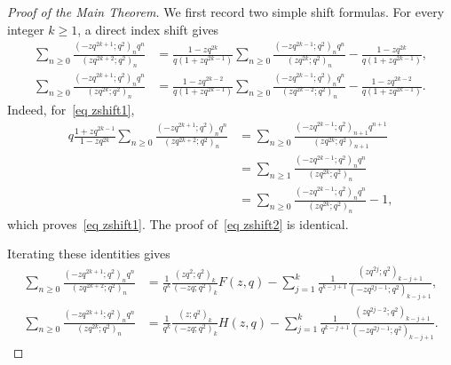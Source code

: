 \documentclass[reqno]{amsart}
\theoremstyle{definition}
\theoremstyle{plain}
\theoremstyle{remark}
\numberwithin{equation}{section}
\begin{document}
\begin{proof}[Proof of the Main Theorem]
We first record two simple shift formulas. For every integer $k\ge 1$, a direct index shift gives
\begin{align}
\sum_{n\ge 0}\frac{(-zq^{2k+1};q^2)_n q^n}{(zq^{2k+2};q^2)_n}
&=\frac{1-zq^{2k}}{q(1+zq^{2k-1})}
\sum_{n\ge 0}\frac{(-zq^{2k-1};q^2)_n q^n}{(zq^{2k};q^2)_n}
-\frac{1-zq^{2k}}{q(1+zq^{2k-1})}, \label{eq zshift1}\\
\sum_{n\ge 0}\frac{(-zq^{2k+1};q^2)_n q^n}{(zq^{2k};q^2)_n}
&=\frac{1-zq^{2k-2}}{q(1+zq^{2k-1})}
\sum_{n\ge 0}\frac{(-zq^{2k-1};q^2)_n q^n}{(zq^{2k-2};q^2)_n}
-\frac{1-zq^{2k-2}}{q(1+zq^{2k-1})}. \label{eq zshift2}
\end{align}
Indeed, for~\eqref{eq zshift1},
\begin{align*}
q\frac{1+zq^{2k-1}}{1-zq^{2k}}
\sum_{n\ge 0}\frac{(-zq^{2k+1};q^2)_n q^n}{(zq^{2k+2};q^2)_n}
&=\sum_{n\ge 0}\frac{(-zq^{2k-1};q^2)_{n+1} q^{n+1}}{(zq^{2k};q^2)_{n+1}}\\
&=\sum_{n\ge 1}\frac{(-zq^{2k-1};q^2)_n q^n}{(zq^{2k};q^2)_n}\\
&=\sum_{n\ge 0}\frac{(-zq^{2k-1};q^2)_n q^n}{(zq^{2k};q^2)_n}-1,
\end{align*}
which proves~\eqref{eq zshift1}. The proof of~\eqref{eq zshift2} is identical.

Iterating these identities gives
\begin{align}
\sum_{n\ge 0}\frac{(-zq^{2k+1};q^2)_n q^n}{(zq^{2k+2};q^2)_n}
&=\frac{1}{q^k}\frac{(zq^2;q^2)_k}{(-zq;q^2)_k}F(z,q)
-\sum_{j=1}^k\frac{1}{q^{k-j+1}}
\frac{(zq^{2j};q^2)_{k-j+1}}{(-zq^{2j-1};q^2)_{k-j+1}}, \label{eq ziterate1}\\
\sum_{n\ge 0}\frac{(-zq^{2k+1};q^2)_n q^n}{(zq^{2k};q^2)_n}
&=\frac{1}{q^k}\frac{(z;q^2)_k}{(-zq;q^2)_k}H(z,q)
-\sum_{j=1}^k\frac{1}{q^{k-j+1}}
\frac{(zq^{2j-2};q^2)_{k-j+1}}{(-zq^{2j-1};q^2)_{k-j+1}}. \label{eq ziterate2}
\end{align}


\end{proof}
\end{document}
